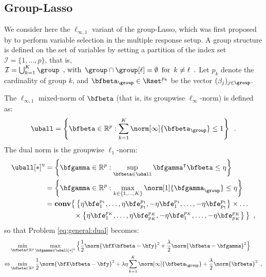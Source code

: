 \subsection{Group-Lasso}

We consider here the $\ell_{\infty,1}$ variant of the group-Lasso, which was
first proposed by \citet{Turlach05} to perform variable selection in the
multiple response setup.
%
A group structure is defined on
the set of variables by setting a partition of the index set
$\mathcal{I}=\{1,\ldots,p\}$, that is,
$
  \mathcal{I}=\bigcup_{k=1}^K\group \enspace,\, \text{with}\enspace 
  \group \cap \group[\ell]=\emptyset \enspace
  \text{for}\enspace k\neq\ell \enspace.
$
%
Let $p_k$ denote the cardinality of group $k$, and $\bfbeta_{\group} \in
\Rset^{p_k}$ be the vector $(\beta_j)_{j\in \group}$.
%


The $\ell_{\infty,1}$ mixed-norm of $\bfbeta$ (that is, its groupwise 
$\ell_\infty$-norm) is defined as:
%
\begin{equation*}
  \uball = \left\{ 
    \bfbeta \in \mathbb{R}^p :\sum_{k=1}^K \norm[\infty]{\bfbeta_{\group}} \leq 1
  \right\}
  \enspace.
\end{equation*}
%
The dual norm is the groupwise $\ell_1$-norm:
%
\begin{align*}
  \uball[*]^\eta & = \left\{ \bfgamma \in \mathbb{R}^p :
\sup_{\bfbeta\in\uball} \bfgamma^\intercal\bfbeta \leq \eta \right\} \\
    & = \left\{ \bfgamma \in \mathbb{R}^p : \max_{k\in\{1,...,K\}}  \norm[1]{\bfgamma_{\group}} \leq \eta \right\} \\
    & = \mathbf{conv} \big\{ 
                        \left\{\eta\bfe^{p_1}_1, \ldots, \eta\bfe^{p_1}_{p_1},-\eta\bfe^{p_1}_1, \ldots, -\eta\bfe^{p_1}_{p_1} \right\} 
                        \times \ldots \\
    & \hspace*{4em} \times 
                        \left\{\eta\bfe^{p_K}_1, \ldots, \eta\bfe^{p_K}_{p_K},-\eta\bfe^{p_K}_1, \ldots, -\eta\bfe^{p_K}_{p_K} \right\} 
                      \big\}
  \enspace,
\end{align*}
so that Problem \eqref{eq:general:dual} becomes:
%
\begin{align*}
  & \min_{\bfbeta\in\mathbb{R}^p} \max_{\bfgamma \in \uball[*]^\eta}
      \Big\{ \frac{1}{2} \norm{\bfX \bfbeta - \bfy}^2 + \frac{\lambda}{2} \norm{\bfbeta - \bfgamma}^2 \Big\} \\
  \Leftrightarrow
    & \min_{\bfbeta\in\mathbb{R}^p}
      \frac{1}{2} \norm{\bfX \bfbeta - \bfy}^2 + \lambda \eta \sum_{k=1}^K \norm[\infty]{\bfbeta_{\group}} + \frac{\lambda}{2} \norm{\bfbeta}^2 
  \enspace,
\end{align*}
%

